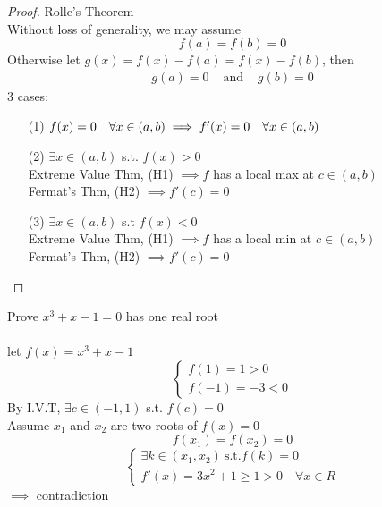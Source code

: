 \begin{proof}
Rolle's Theorem\\
Without loss of generality, we may assume
$$f(a) = f(b) = 0$$
Otherwise let $g(x) = f(x) - f(a) = f(x) - f(b)$, then
$$\begin{array}{rcl}
g(a) = 0 & \text{ and } & g(b) = 0
\end{array}$$
3 cases:
\begin{itemize}
\item[(1)] $f(x) =0 \quad \forall x \in (a, b)\\
\implies f'(x) = 0 \quad  \forall x \in (a, b)$
\item[(2)] $\exists x \in (a, b)$ s.t. $f(x) > 0$\\
Extreme Value Thm, (H1) $\implies f$ has a local max at $c \in (a, b)$\\
Fermat's Thm, (H2) $\implies f'(c) = 0$
\item[(3)] $\exists x \in (a, b)$ s.t $f(x) < 0$\\
Extreme Value Thm, (H1) $\implies f$ has a local min at $c \in (a, b)$\\
Fermat's Thm, (H2) $\implies f'(c) = 0$
\end{itemize}
\end{proof}
\begin{eg}
Prove $x^3+x -1=0$ has one real root\\\\
let $f(x) = x^3+x-1$\\
$$\left\{ \begin{array}{ll}
           f(1) = 1 >0 \\
           f(-1) = -3 <0
        \end{array} \right.
$$
By I.V.T, $\exists c \in (-1, 1)$ s.t. $f(c) =0$\\
Assume $x_1$ and $x_2$ are two roots of $f(x)=0$\\
$$f(x_1)=f(x_2)=0$$
$$\left\{ \begin{array}{ll}
           \exists k \in (x_1, x_2) \  \text{s.t.} f(k)=0\\
           f'(x) = 3x^2 +1 \geq 1 > 0 \quad \forall x \in R
        \end{array} \right.
$$ 
$\implies$ contradiction
\end{eg}
